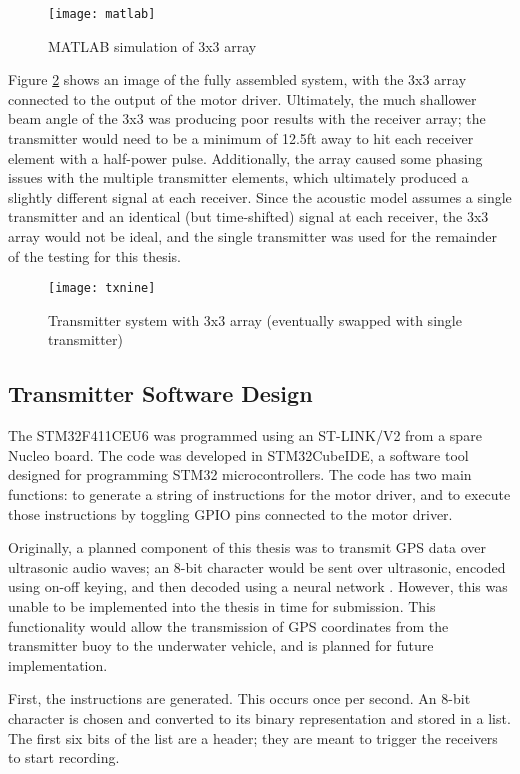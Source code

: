 \documentclass[12pt,a4paper]{report}
\begin{document}
\begin{figure}[htbp]
	\centering
	\texttt{[image: matlab]}
	\caption{MATLAB simulation of 3x3 array}
	\label{fig:matlab}
\end{figure}

Figure \ref{fig:txnine} shows an image of the fully assembled system, with the 3x3 array connected to the output of the motor driver. Ultimately, the much shallower beam angle of the 3x3 was producing poor results with the receiver array; the transmitter would need to be a minimum of 12.5ft away to hit each receiver element with a half-power pulse. Additionally, the array caused some phasing issues with the multiple transmitter elements, which ultimately produced a slightly different signal at each receiver. Since the acoustic model assumes a single transmitter and an identical (but time-shifted) signal at each receiver, the 3x3 array would not be ideal, and the single transmitter was used for the remainder of the testing for this thesis.

\begin{figure}[htbp]
	\centering
	\texttt{[image: txnine]}
	\caption{Transmitter system with 3x3 array (eventually swapped with single transmitter)}
	\label{fig:txnine}
\end{figure}

\subsection{Transmitter Software Design} \label{ssec:3s6s2}
The STM32F411CEU6 was programmed using an ST-LINK/V2 from a spare Nucleo board. The code was developed in STM32CubeIDE, a software tool designed for programming STM32 microcontrollers. The code has two main functions: to generate a string of instructions for the motor driver, and to execute those instructions by toggling GPIO pins connected to the motor driver. 

Originally, a planned component of this thesis was to transmit GPS data over ultrasonic audio waves; an 8-bit character would be sent over ultrasonic, encoded using on-off keying, and then decoded using a neural network \cite{ultrann}. However, this was unable to be implemented into the thesis in time for submission. This functionality would allow the transmission of GPS coordinates from the transmitter buoy to the underwater vehicle, and is planned for future implementation.

First, the instructions are generated. This occurs once per second. An 8-bit character is chosen and converted to its binary representation and stored in a list. The first six bits of the list are a header; they are meant to trigger the receivers to start recording.
\end{document}
